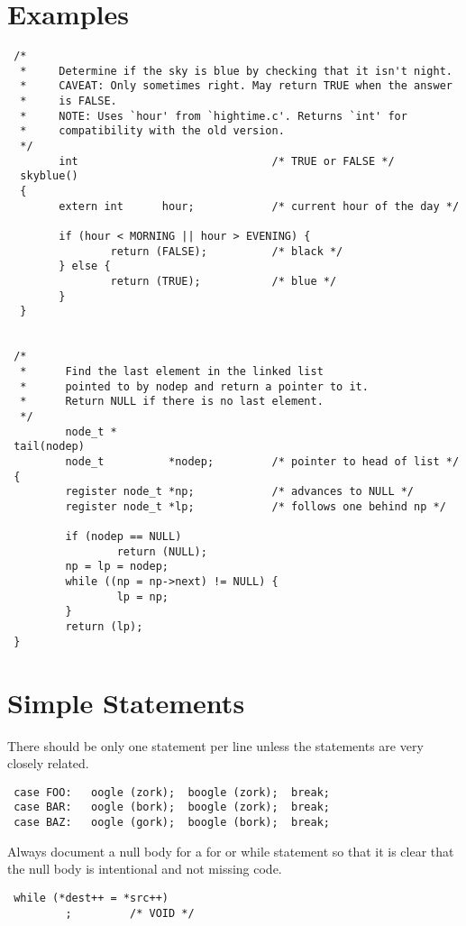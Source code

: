\section{Examples}
\begin{verbatim}
 /*
  *     Determine if the sky is blue by checking that it isn't night.
  *     CAVEAT: Only sometimes right. May return TRUE when the answer
  *     is FALSE.
  *     NOTE: Uses `hour' from `hightime.c'. Returns `int' for
  *     compatibility with the old version.
  */
        int                              /* TRUE or FALSE */
  skyblue()
  {
        extern int      hour;            /* current hour of the day */ 

        if (hour < MORNING || hour > EVENING) {
                return (FALSE);          /* black */
        } else {
                return (TRUE);           /* blue */
        }
  }


 /*
  *      Find the last element in the linked list
  *      pointed to by nodep and return a pointer to it.
  *      Return NULL if there is no last element.
  */
         node_t *
 tail(nodep)
         node_t          *nodep;         /* pointer to head of list */
 {
         register node_t *np;            /* advances to NULL */
         register node_t *lp;            /* follows one behind np */ 

         if (nodep == NULL)
                 return (NULL);
         np = lp = nodep;
         while ((np = np->next) != NULL) {
                 lp = np;
         }
         return (lp);
 }  
\end{verbatim}
\newpage
\section{Simple Statements}
 There should be only one statement per line unless the statements are very
closely related. 
\begin{verbatim}
 case FOO:   oogle (zork);  boogle (zork);  break;
 case BAR:   oogle (bork);  boogle (zork);  break;
 case BAZ:   oogle (gork);  boogle (bork);  break;
\end{verbatim}

Always document a null body for a for or while statement so that it is clear
that the null body is intentional and not missing code. 
\begin{verbatim}
 while (*dest++ = *src++)
         ;         /* VOID */ 
\end{verbatim}


